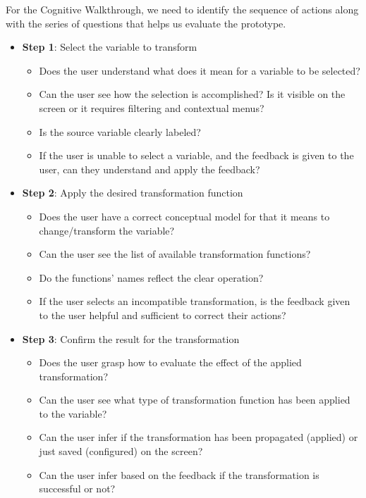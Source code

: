 \documentclass[12pt,letterpaper]{article}
\begin{document}
For the Cognitive Walkthrough, we need to identify the sequence of actions along with the series of questions that helps us evaluate the prototype.

\begin{itemize}
    \item \textbf{Step 1}: Select the variable to transform
    \begin{itemize}
        \item Does the user understand what does it mean for a variable to be selected?
        \item Can the user see how the selection is accomplished? Is it visible on the screen or it requires filtering and contextual menus?
        \item Is the source variable clearly labeled?
        \item If the user is unable to select a variable, and the feedback is given to the user, can they understand and apply the feedback? 
    \end{itemize}
    \item \textbf{Step 2}: Apply the desired transformation function
    \begin{itemize}
        \item Does the user have a correct conceptual model for that it means to change/transform the variable?
        \item Can the user see the list of available transformation functions?
        \item Do the functions' names reflect the clear operation? 
        \item If the user selects an incompatible transformation, is the feedback given to the user helpful and sufficient to correct their actions?
    \end{itemize}
    \item \textbf{Step 3}: Confirm the result for the transformation
    \begin{itemize}
        \item Does the user grasp how to evaluate the effect of the applied transformation?
        \item Can the user see what type of transformation function has been applied to the variable?
        \item Can the user infer if the transformation has been propagated (applied) or just saved (configured) on the screen?
        \item Can the user infer based on the feedback if the transformation is successful or not?
    \end{itemize}
\end{itemize}
\end{document}
